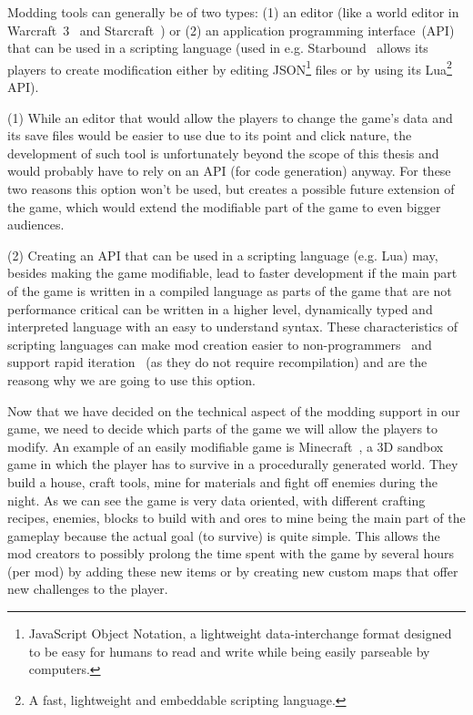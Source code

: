 Modding tools can generally be of two types: (1) an editor (like a world editor in Warcraft~3~\cite{WC3} and
Starcraft~\cite{SC}) or (2) an application programming interface~(API) that can be used in a scripting language 
(used in e.g. Starbound~\cite{Starbound} allows its players to create modification either by editing 
JSON\footnote{JavaScript Object Notation, a lightweight data-interchange
format designed to be easy for humans to read and write while being easily parseable by computers.\cite{JSON}} files or by using its
Lua\footnote{A fast, lightweight and embeddable scripting language.\cite{Lua}} API).

(1) While an editor that would allow the players to change the game's data and its save files would be easier to use due to its
point and click nature, the development of such tool is unfortunately beyond the scope of this thesis and would probably have to rely
on an API (for code generation) anyway. For these two reasons this option won't be used, but creates a possible future extension of the game,
which would extend the modifiable part of the game to even bigger audiences.

(2) Creating an API that can be used in a scripting language (e.g. Lua) may, besides making the game modifiable, lead to faster
development if the main part of the game is written in a compiled language as parts of the game that are not performance critical
can be written in a higher level, dynamically typed and interpreted language with an easy to understand syntax. 
These characteristics of scripting languages can make mod creation easier to non-programmers~\cite{WhyScripting} and support
rapid iteration~\cite{GEA} (as they do not require recompilation) and are the reasong why we are going to use this option.

Now that we have decided on the technical aspect of the modding support in our game, we need to decide which parts of the game
we will allow the players to modify. An example of an easily modifiable game is Minecraft~\cite{Minecraft}, a 3D sandbox game 
in which the player has to survive in a procedurally generated world. They build a house, craft tools, mine for materials and
fight off enemies during the night. As we can see the game is very data oriented, with different crafting recipes, enemies, blocks
to build with and ores to mine being the main part of the gameplay because the actual goal (to survive) is quite simple. This allows
the mod creators to possibly prolong the time spent with the game by several hours (per mod) by adding these new items or by
creating new custom maps that offer new challenges to the player.

